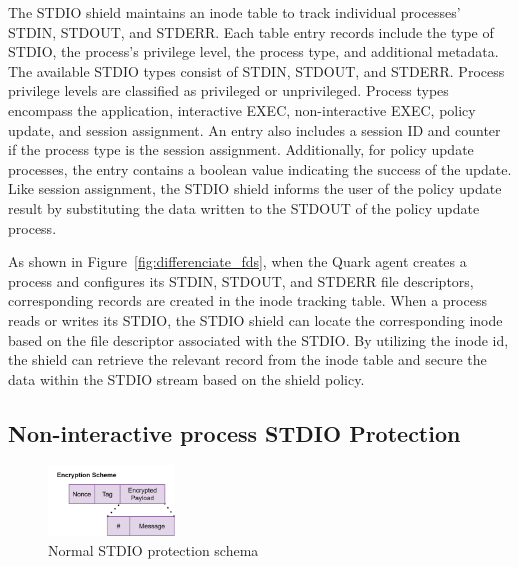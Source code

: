 The STDIO shield maintains an inode table to track individual processes' STDIN, STDOUT, and STDERR. Each table entry records include the type of STDIO, the process's privilege level, the process type, and additional metadata. The available STDIO types consist of STDIN, STDOUT, and STDERR. Process privilege levels are classified as 
privileged or unprivileged. Process types encompass the application, interactive EXEC, non-interactive EXEC, policy update, and session assignment. An entry also includes a session ID and counter if the process type is the session assignment. Additionally, for policy update processes, the entry contains a boolean 
value indicating the success of the update. Like session assignment, the STDIO shield informs the user of the policy update result by substituting the data written to the STDOUT of the policy update process.

As shown in Figure~\ref{fig:differenciate_fds}, when the Quark agent creates a process and configures its STDIN, STDOUT, and STDERR file descriptors, corresponding records are created in the inode tracking table. When a process reads or writes its STDIO, the STDIO shield can locate the corresponding inode based on the file descriptor associated 
with the STDIO. By utilizing the inode id, the shield can retrieve the relevant record from the inode table and secure the data within the STDIO stream based on the shield policy.

\subsection{Non-interactive process STDIO Protection}
\label{sec:design_non_interactive_stdio}
\begin{figure}[!htb]
    \centering
    \includegraphics[width=0.3\textwidth]{images/normal_io_shiled_encryption_schema.png}
    \caption[Normal STDIO protection schema]{Normal STDIO protection schema}
    \label{fig:normal_io_shiled}
\end{figure}

